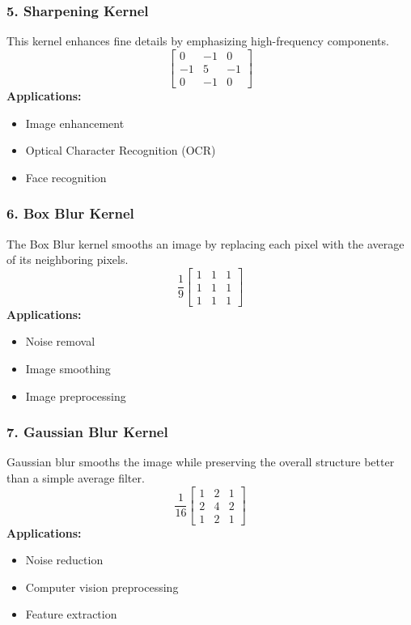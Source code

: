 \documentclass[11pt]{article}
\begin{document}
\subsubsection*{5. Sharpening Kernel}
This kernel enhances fine details by emphasizing high-frequency components.
\[
\begin{bmatrix}
0 & -1 & 0 \\
-1 & 5 & -1 \\
0 & -1 & 0
\end{bmatrix}
\]
\textbf{Applications:}
\begin{itemize}
    \item Image enhancement
    \item Optical Character Recognition (OCR)
    \item Face recognition
\end{itemize}

\subsubsection*{6. Box Blur Kernel}
The Box Blur kernel smooths an image by replacing each pixel with the average of its neighboring pixels.
\[
\frac{1}{9}
\begin{bmatrix}
1 & 1 & 1 \\
1 & 1 & 1 \\
1 & 1 & 1
\end{bmatrix}
\]
\textbf{Applications:}
\begin{itemize}
    \item Noise removal
    \item Image smoothing
    \item Image preprocessing
\end{itemize}

\subsubsection*{7. Gaussian Blur Kernel}
Gaussian blur smooths the image while preserving the overall structure better than a simple average filter.
\[
\frac{1}{16}
\begin{bmatrix}
1 & 2 & 1 \\
2 & 4 & 2 \\
1 & 2 & 1
\end{bmatrix}
\]
\textbf{Applications:}
\begin{itemize}
    \item Noise reduction
    \item Computer vision preprocessing
    \item Feature extraction
\end{itemize}
\end{document}
